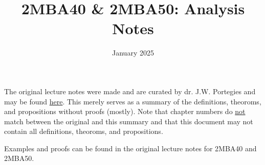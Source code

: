\documentclass[fleqn]{article}
\title{2MBA40 \& 2MBA50: Analysis Notes}
\author{}
\date{January 2025}
\newcommand{\ul}[1]{\underline{#1}}
\begin{document}
\maketitle

The original lecture notes were made and are curated by dr. J.W. Portegies and may be found
\href{https://gitlab.tue.nl/jim-portegies/analysis}{here}. This merely
serves as a summary of the definitions, theoroms, and propositions
without proofs (mostly). Note that chapter numbers do \ul{not} match between
the original and this summary and that this document may not contain
all definitions, theoroms, and propositions.

Examples and proofs can be found in the original lecture notes for 2MBA40 and 2MBA50.














\end{document}
